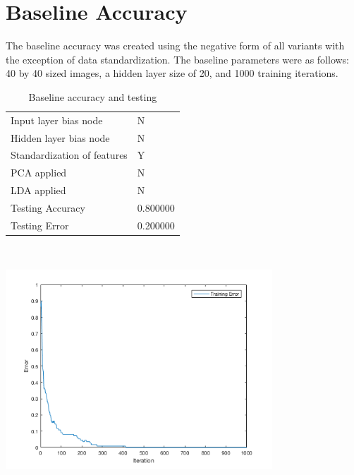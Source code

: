 \documentclass[12pt]{article}
\newcommand{\accuracyAndTestErrorTable}[8]{
  \begin{tabular}{l|l}
    \hline
    Input layer bias node & #1 \\
    Hidden layer bias node & #2 \\
    Standardization of features & #3 \\
    PCA applied & #4 \\
    LDA applied & #5 \\
    \hline
    Testing Accuracy & #6 \\
    Testing Error & #7 \\
    \hline
  \end{tabular}
  ~\\[60pt]
  \caption{#8}
}
\begin{document}
\section{Baseline Accuracy}
The baseline accuracy was created using the negative form of all variants with the exception of data standardization. The baseline parameters were as follows: 40 by 40 sized images, a hidden layer size of 20, and 1000 training iterations.
\begin{center}
  \begin{table}[H]
    \begin{varwidth}[b]{0.4\linewidth}
      \centering
      \accuracyAndTestErrorTable{N}{N}{Y}{N}{N}{0.800000}{0.200000}{Baseline accuracy and testing}
      \label{table:baseline}
    \end{varwidth}%
    \hfill
    \begin{minipage}[b]{0.6\linewidth}
      \centering
      \includegraphics[width=100mm]{baseline_training_error.png}
      \label{fig:baseline_img}
    \end{minipage}
  \end{table}
\end{center}

\end{document}

